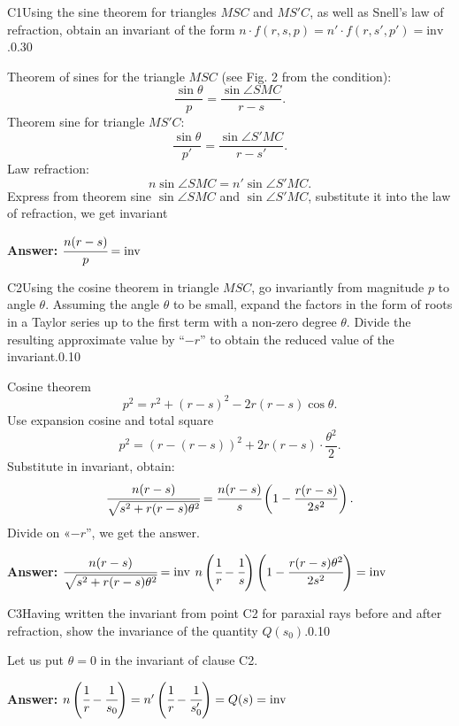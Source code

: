 \documentclass[11pt,a4paper]{article}
\begin{document}
\begin{solcard}{C1}{Using the sine theorem for triangles $MSC$ and $MS'C$, as well as Snell’s law of refraction, obtain an invariant of the form $n\cdot f(r, s, p)=n'\cdot f(r, s', p')=\mathrm{inv}$.}{0.30}

Theorem of sines for the triangle $MSC$ (see Fig. 2 from the condition): $$\frac{\sin \theta}{p} = \frac{\sin \angle SMC}{r-s}.$$ Theorem sine for triangle $MS'C$: $$\frac{\sin \theta}{p'} = \frac{\sin \angle S'MC}{r-s'}.$$ Law refraction: $$n \sin \angle SMC = n' \sin \angle S'MC.$$ Express from theorem sine $\sin \angle SMC$ and $\sin \angle S'MC$, substitute it into the law of refraction, we get invariant

\par\smallskip\noindent\textbf{Answer:} $\cfrac{n(r-s)}{p}=\mathrm{inv}$
\end{solcard}

\begin{solcard}{C2}{Using the cosine theorem in triangle $MSC$, go invariantly from magnitude $p$ to angle $\theta$. Assuming the angle $\theta$ to be small, expand the factors in the form of roots in a Taylor series up to the first term with a non-zero degree $\theta$. Divide the resulting approximate value by “$-r$” to obtain the reduced value of the invariant.}{0.10}

Cosine theorem $$p^2 = r^2 + (r-s)^2 - 2 r (r-s) \cos \theta.$$ Use expansion cosine and total square $$p^2 = (r - (r-s))^2 + 2 r(r-s) \cdot \frac{ \theta^2 }{ 2}.$$ Substitute in invariant, obtain: $$\cfrac{n(r-s)}{\sqrt{s^2+r(r-s)\theta^2}}=\cfrac{n(r-s)}{s} \left( 1 - \frac{r(r-s)}{2s^2} \right).$$ Divide on «$-r$”, we get the answer.

\par\smallskip\noindent\textbf{Answer:} $\cfrac{n(r-s)}{\sqrt{s^2+r(r-s)\theta^2}}=\mathrm{inv}$ $n\left(\cfrac{1}{r}-\cfrac{1}{s}\right)\left(1-\cfrac{r(r-s)\theta^2}{2s^2}\right)=\mathrm{inv}$
\end{solcard}

\begin{solcard}{C3}{Having written the invariant from point C2 for paraxial rays before and after refraction, show the invariance of the quantity $Q(s_0)$.}{0.10}

Let us put $\theta = 0$ in the invariant of clause C2.

\par\smallskip\noindent\textbf{Answer:} $n\left(\cfrac{1}{r}-\cfrac{1}{s_0}\right)=n'\left(\cfrac{1}{r}-\cfrac{1}{s_0'}\right)=Q(s)=\mathrm{inv}$
\end{solcard}
\end{document}
